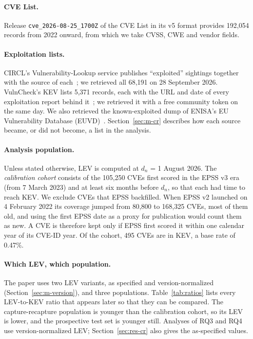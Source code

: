 \paragraph{CVE List.} Release \texttt{cve\_2026-08-25\_1700Z} of the CVE List
in its v5 format provides 192,054 records from 2022 onward, from which we take
CVSS, CWE and vendor fields.

\paragraph{Exploitation lists.} CIRCL's Vulnerability-Lookup service publishes
``exploited'' sightings together with the source of each~\cite{circl2026lookup};
we retrieved all 68,191 on 28 September 2026. VulnCheck's KEV lists 5,371
records, each with the URL and date of every exploitation report behind
it~\cite{vulncheck2026kev}; we retrieved it with a free community token on the
same day. We also retrieved the known-exploited dump of ENISA's EU
Vulnerability Database (EUVD)~\cite{enisa2026euvd}.
Section~\ref{sec:m-cr} describes how each source became, or did not become, a
list in the analysis.

\paragraph{Analysis population.} Unless stated otherwise, LEV is computed at
$d_n$ = 1 August 2026. The \emph{calibration cohort} consists of the 105,250
CVEs first scored in the EPSS v3 era (from 7 March 2023) and at least six
months before $d_n$, so that each had time to reach KEV. We exclude CVEs that
EPSS backfilled. When EPSS v2 launched on 4 February 2022 its coverage jumped
from 80,800 to 168,325 CVEs, most of them old, and using the first EPSS date as
a proxy for publication would count them as new. A CVE is therefore kept only
if EPSS first scored it within one calendar year of its CVE-ID year. Of the
cohort, 495 CVEs are in KEV, a base rate of 0.47\%.

\paragraph{Which LEV, which population.} The paper uses two LEV variants, as
specified and version-normalized (Section~\ref{sec:m-version}), and three
populations. Table~\ref{tab:ratios} lists every LEV-to-KEV ratio that appears
later so that they can be compared. The capture-recapture population is younger
than the calibration cohort, so its LEV is lower, and the prospective test set
is younger still. Analyses of RQ3 and RQ4 use version-normalized LEV;
Section~\ref{sec:res-cr} also gives the as-specified values.

